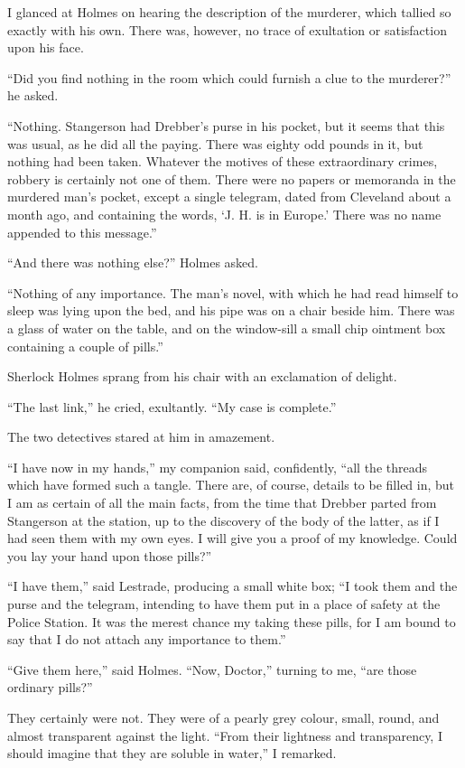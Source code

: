 \documentclass[12pt]{book}
\begin{document}
I glanced at Holmes on hearing the description of the murderer, which tallied so exactly with his own. There was, however, no trace of exultation or satisfaction upon his face. 

“Did you find nothing in the room which could furnish a clue to the murderer?” he asked. 

“Nothing. Stangerson had Drebber’s purse in his pocket, but it seems that this was usual, as he did all the paying. There was eighty odd pounds in it, but nothing had been taken. Whatever the motives of these extraordinary crimes, robbery is certainly not one of them. There were no papers or memoranda in the murdered man’s pocket, except a single telegram, dated from Cleveland about a month ago, and containing the words, ‘J. H. is in Europe.’ There was no name appended to this message.” 

“And there was nothing else?” Holmes asked. 

“Nothing of any importance. The man’s novel, with which he had read himself to sleep was lying upon the bed, and his pipe was on a chair beside him. There was a glass of water on the table, and on the window-sill a small chip ointment box containing a couple of pills.” 

Sherlock Holmes sprang from his chair with an exclamation of delight. 

“The last link,” he cried, exultantly. “My case is complete.” 

The two detectives stared at him in amazement. 

“I have now in my hands,” my companion said, confidently, “all the threads which have formed such a tangle. There are, of course, details to be filled in, but I am as certain of all the main facts, from the time that Drebber parted from Stangerson at the station, up to the discovery of the body of the latter, as if I had seen them with my own eyes. I will give you a proof of my knowledge. Could you lay your hand upon those pills?” 

“I have them,” said Lestrade, producing a small white box; “I took them and the purse and the telegram, intending to have them put in a place of safety at the Police Station. It was the merest chance my taking these pills, for I am bound to say that I do not attach any importance to them.” 

“Give them here,” said Holmes. “Now, Doctor,” turning to me, “are those ordinary pills?” 

They certainly were not. They were of a pearly grey colour, small, round, and almost transparent against the light. “From their lightness and transparency, I should imagine that they are soluble in water,” I remarked. 
\end{document}
